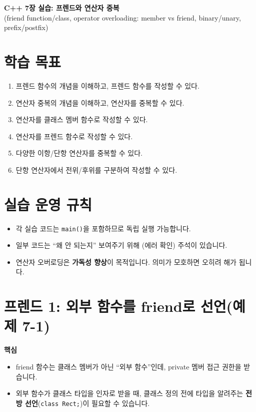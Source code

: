 \documentclass[11pt,a4paper]{article}
\begin{document}
\begin{center}
  {\LARGE \textbf{C++ 7장 실습: 프렌드와 연산자 중복}}\\
  \vspace{6pt}
  {\large (friend function/class, operator overloading: member vs friend, binary/unary, prefix/postfix)}
\end{center}

\vspace{8pt}

\section*{학습 목표}
\begin{GoalBox}
\begin{enumerate}[leftmargin=18pt]
  \item 프렌드 함수의 개념을 이해하고, 프렌드 함수를 작성할 수 있다.
  \item 연산자 중복의 개념을 이해하고, 연산자를 중복할 수 있다.
  \item 연산자를 클래스 멤버 함수로 작성할 수 있다.
  \item 연산자를 프렌드 함수로 작성할 수 있다.
  \item 다양한 이항/단항 연산자를 중복할 수 있다.
  \item 단항 연산자에서 전위/후위를 구분하여 작성할 수 있다.
\end{enumerate}
\end{GoalBox}

\section*{실습 운영 규칙}
\begin{itemize}[leftmargin=18pt]
  \item 각 실습 코드는 \texttt{main()}을 포함하므로 독립 실행 가능합니다.
  \item 일부 코드는 ``왜 안 되는지'' 보여주기 위해 (에러 확인) 주석이 있습니다.
  \item 연산자 오버로딩은 \textbf{가독성 향상}이 목적입니다. 의미가 모호하면 오히려 해가 됩니다.
\end{itemize}

\tableofcontents
\newpage

\section{프렌드 1: 외부 함수를 friend로 선언(예제 7-1)}
\begin{GoalBox}
\textbf{핵심}
\begin{itemize}[leftmargin=18pt]
  \item friend 함수는 클래스 멤버가 아닌 ``외부 함수''인데, private 멤버 접근 권한을 받습니다.
  \item 외부 함수가 클래스 타입을 인자로 받을 때, 클래스 정의 전에 타입을 알려주는 \textbf{전방 선언}(\texttt{class Rect;})이 필요할 수 있습니다.
\end{itemize}
\end{GoalBox}
\end{document}
